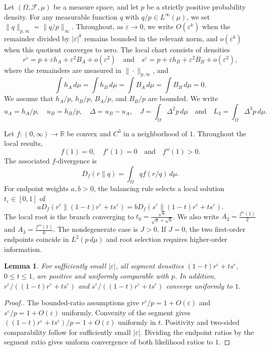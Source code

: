 \documentclass[11pt]{article}
\theoremstyle{plain}
\newtheorem{lemma}[theorem]{Lemma}
\theoremstyle{definition}
\theoremstyle{definition}
\newcommand{\eps}{\varepsilon}
\newcommand{\R}{\mathbb R}
\begin{document}
Let $(\Omega,\mathcal F,\mu)$ be a measure space, and let $p$ be a strictly positive probability density. For any measurable function $q$ with $q/p\in L^\infty(\mu)$,  we set $\|q\|_{p,\infty}=\|q/p\|_\infty$. 
Throughout, as $\eps\to0$, we write $O(\eps^k)$ when the remainder divided by $|\eps|^k$ remains bounded in the relevant norm, and $o(\eps^k)$ when this quotient converges to zero.
The local chart consists of densities
\[
r^\eps=p+\eps h_A+\eps^2B_A+o(\eps^2)\quad\text{and}\quad
s^\eps=p+\eps h_B+\eps^2B_B+o(\eps^2),
\]
where the remainders are measured in $\|\cdot\|_{p,\infty}$, and
\[
\int h_A\,d\mu=\int h_B\,d\mu=\int B_A\,d\mu=\int B_B\,d\mu=0.
\]
We assume that $h_A/p$, $h_B/p$, $B_A/p$, and $B_B/p$ are bounded. We write
\[
u_A=h_A/p,\quad u_B=h_B/p,\quad \Delta=u_B-u_A,
\quad
J=\int_\Omega \Delta^2p\,d\mu
\quad\text{and}\quad
L_3=\int_\Omega \Delta^3p\,d\mu.
\]

Let $f:(0,\infty)\to\R$ be convex and $C^3$ in a neighborhood of $1$. Throughout the local results,
\[
f(1)=0,
\quad f'(1)=0
\quad\text{and}\quad f''(1)>0.
\]
The associated $f$-divergence is
\[
D_f(r\|q)=\int_\Omega q f(r/q)\,d\mu.
\]
For endpoint weights $a,b>0$, the balancing rule selects a local solution $t_\eps\in[0,1]$ of
\[
aD_f(r^\eps\|(1-t)r^\eps+ts^\eps)=bD_f(s^\eps\|(1-t)r^\eps+ts^\eps).
\]
The local root is the branch converging to
$t_0=\frac{\sqrt b}{\sqrt a+\sqrt b}$.
We also write
$A_2=\frac{f''(1)}2$ and $A_3=\frac{f'''(1)}6$.
The nondegenerate case is $J>0$. If $J=0$, the two first-order endpoints coincide in $L^2(p\,d\mu)$ and root selection requires higher-order information.

\begin{lemma}\label{lem:chart}
For sufficiently small $|\eps|$, all segment densities $(1-t)r^\eps+ts^\eps$, $0\le t\le1$, are positive and uniformly comparable with $p$. In addition, $r^\eps/((1-t)r^\eps+ts^\eps)$ and $s^\eps/((1-t)r^\eps+ts^\eps)$ converge uniformly to $1$.
\end{lemma}

\begin{proof}[Proof.]
The bounded-ratio assumptions give $r^\eps/p=1+O(\eps)$ and $s^\eps/p=1+O(\eps)$ uniformly. Convexity of the segment gives $((1-t)r^\eps+ts^\eps)/p=1+O(\eps)$ uniformly in $t$. Positivity and two-sided comparability follow for sufficiently small $|\eps|$. Dividing the endpoint ratios by the segment ratio gives uniform convergence of both likelihood ratios to $1$.

\end{proof}
\end{document}
